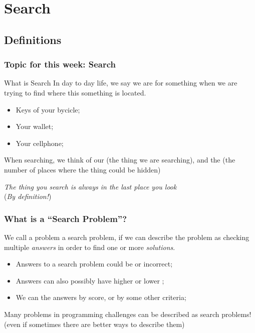 \documentclass{beamer}
\begin{document}
\section{Search}

\subsection{Definitions}
\begin{frame}
  \frametitle{Topic for this week: Search}

  \begin{block}{What is Search}
    In day to day life, we say we are  for
    something when we are trying to find where this something is
    located.

    \begin{itemize}
    \item Keys of your bycicle;
    \item Your wallet;
    \item Your cellphone;
    \end{itemize}

    When searching, we think of our  (the thing we are
    searching), and the  (the number of places
    where the thing could be hidden)

  \end{block}

  {\smaller
  \hfill \emph{The thing you search is always in the last place you look}\\
  \hfill (\emph{By definition!})}
\end{frame}

\begin{frame}
  \frametitle{What is a ``Search Problem''?}
  {\small

    We call a problem a search problem, if we can describe the problem
    as checking multiple \emph{answers} in order to find one or more
    \emph{solutions}.

    \medskip

    \begin{itemize}
    \item Answers to a search problem could be  or \alert{incorrect};
    \item Answers can also possibly have higher or lower ;
    \item We can  the answers by score, or by some other criteria;
    \end{itemize}

    \bigskip

    Many problems in programming challenges can be described as search
    problems! (even if sometimes there are better ways to describe
    them)
  }
\end{frame}
\end{document}
